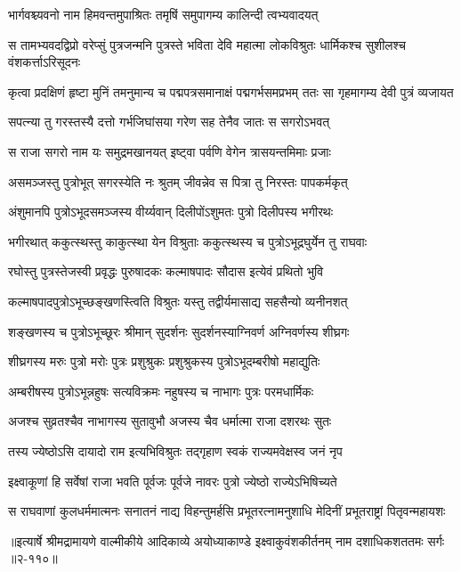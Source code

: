 \twolineshloka
{भार्गवश्च्यवनो नाम हिमवन्तमुपाश्रितः}
{तमृषिं समुपागम्य कालिन्दी त्वभ्यवादयत्} %

\threelineshloka
{स तामभ्यवदद्विप्रो वरेप्सुं पुत्रजन्मनि}
{पुत्रस्ते भविता देवि महात्मा लोकविश्रुतः}
{धार्मिकश्च सुशीलश्च वंशकर्त्ताऽरिसूदनः} %

\threelineshloka
{कृत्वा प्रदक्षिणं हृष्टा मुनिं तमनुमान्य च}
{पद्मपत्रसमानाक्षं पद्मगर्भसमप्रभम्}
{ततः सा गृहमागम्य देवी पुत्रं व्यजायत} %

\twolineshloka
{सपत्न्या तु गरस्तस्यै दत्तो गर्भजिघांसया}
{गरेण सह तेनैव जातः स सगरोऽभवत्} %

\twolineshloka
{स राजा सगरो नाम यः समुद्रमखानयत्}
{इष्ट्वा पर्वणि वेगेन त्रासयन्तमिमाः प्रजाः} %

\twolineshloka
{असमञ्जस्तु पुत्रोभूत् सगरस्येति नः श्रुतम्}
{जीवन्नेव स पित्रा तु निरस्तः पापकर्मकृत्} %

\twolineshloka
{अंशुमानपि पुत्रोऽभूदसमञ्जस्य वीर्य्यवान्}
{दिलीपोंऽशुमतः पुत्रो दिलीपस्य भगीरथः} %

\twolineshloka
{भगीरथात् ककुत्स्थस्तु काकुत्स्था येन विश्रुताः}
{ककुत्स्थस्य च पुत्रोऽभूद्रघुर्येन तु राघवाः} %

\twolineshloka
{रघोस्तु पुत्रस्तेजस्वी प्रवृद्धः पुरुषादकः}
{कल्माषपादः सौदास इत्येवं प्रथितो भुवि} %

\twolineshloka
{कल्माषपादपुत्रोऽभूच्छङ्खणस्त्विति विश्रुतः}
{यस्तु तद्वीर्यमासाद्य सहसैन्यो व्यनीनशत्} %

\twolineshloka
{शङ्खणस्य च पुत्रोऽभूच्छूरः श्रीमान् सुदर्शनः}
{सुदर्शनस्याग्निवर्ण अग्निवर्णस्य शीघ्रगः} %

\twolineshloka
{शीघ्रगस्य मरुः पुत्रो मरोः पुत्रः प्रशुश्रुकः}
{प्रशुश्रुकस्य पुत्रोऽभूदम्बरीषो महाद्युतिः} %

\twolineshloka
{अम्बरीषस्य पुत्रोऽभून्नहुषः सत्यविक्रमः}
{नहुषस्य च नाभागः पुत्रः परमधार्मिकः} %

\twolineshloka
{अजश्च सुव्रतश्चैव नाभागस्य सुतावुभौ}
{अजस्य चैव धर्मात्मा राजा दशरथः सुतः} %

\twolineshloka
{तस्य ज्येष्ठोऽसि दायादो राम इत्यभिविश्रुतः}
{तद्गृहाण स्वकं राज्यमवेक्षस्व जनं नृप} %

\twolineshloka
{इक्ष्वाकूणां हि सर्वेषां राजा भवति पूर्वजः}
{पूर्वजे नावरः पुत्रो ज्येष्ठो राज्येऽभिषिच्यते} %

\twolineshloka
{स राघवाणां कुलधर्ममात्मनः सनातनं नाद्य विहन्तुमर्हसि}
{प्रभूतरत्नामनुशाधि मेदिनीं प्रभूतराष्ट्रां पितृवन्महायशः} %


॥इत्यार्षे श्रीमद्रामायणे वाल्मीकीये आदिकाव्ये अयोध्याकाण्डे इक्ष्वाकुवंशकीर्तनम् नाम दशाधिकशततमः सर्गः ॥२-११०॥
